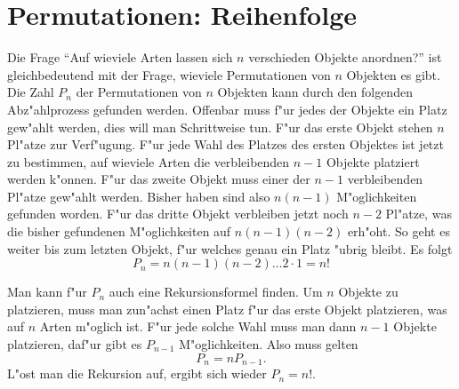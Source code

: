 \section{Permutationen: Reihenfolge\label{kombinatorik-permutation}}
Die Frage ``Auf wieviele Arten lassen sich $n$ verschieden Objekte anordnen?''
ist gleichbedeutend mit der Frage, wieviele Permutationen von $n$
Objekten es gibt. Die Zahl  $P_n$ der Permutationen von $n$ Objekten
kann durch den folgenden Abz"ahlprozess gefunden werden. Offenbar
muss f"ur jedes der Objekte ein Platz gew"ahlt werden, dies will
man Schrittweise tun. F"ur das erste Objekt stehen $n$ Pl"atze
zur Verf"ugung. F"ur jede Wahl des Platzes des ersten Objektes 
ist jetzt zu bestimmen, auf wieviele Arten die verbleibenden
$n-1$ Objekte platziert werden k"onnen. F"ur das zweite
Objekt muss einer der $n-1$ verbleibenden Pl"atze gew"ahlt werden.
Bisher haben sind also $n(n-1)$ M"oglichkeiten gefunden worden.
F"ur das dritte Objekt verbleiben jetzt noch $n-2$ Pl"atze,
was die bisher gefundenen M"oglichkeiten auf $n(n-1)(n-2)$
erh"oht. So geht es weiter bis zum letzten Objekt, f"ur welches
genau ein Platz "ubrig bleibt. Es folgt
\[
P_n=n(n-1)(n-2)\dots 2\cdot 1=n!
\]

Man kann f"ur $P_n$ auch eine Rekursionsformel finden. Um $n$ Objekte
zu platzieren, muss man zun"achst einen Platz f"ur das erste Objekt
platzieren, was auf $n$ Arten m"oglich ist. F"ur jede solche Wahl
muss man dann $n-1$ Objekte platzieren, daf"ur gibt es $P_{n-1}$
M"oglichkeiten. Also muss gelten
\[
P_n=nP_{n-1}.
\]
L"ost man die Rekursion auf, ergibt sich wieder $P_n=n!$.



